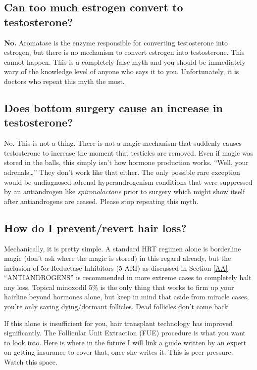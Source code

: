 \documentclass{article}
\begin{document}
{{\subsection{Can too much estrogen convert to testosterone?}

\textbf{No.} Aromatase is the enzyme responsible for converting testosterone into estrogen, but there is no mechanism to convert estrogen into testosterone. This cannot happen. This is a completely false myth and you should be immediately wary of the knowledge level of anyone who says it to you. Unfortunately, it is doctors who repeat this myth the most.

\subsection{Does bottom surgery cause an increase in testosterone?}

No. This is not a thing. There is not a magic mechanism that suddenly causes testosterone to increase the moment that testicles are removed. Even if magic was stored in the balls, this simply isn’t how hormone production works. “Well, your adrenals…” They don’t work like that either. The only possible rare exception would be undiagnosed adrenal hyperandrogenism conditions that were suppressed by an antiandrogen like \textit{spironolactone }prior to surgery which might show itself after antiandrogens are ceased. Please stop repeating this myth.

\subsection{How do I prevent/revert hair loss?}\label{11-14}

Mechanically, it is pretty simple. A standard HRT regimen alone is borderline magic (don’t ask where the magic is stored) in this regard already, but the inclusion of 5$\alpha$-Reductase Inhibitors (5-ARI) as discussed in Section \ref{AA} “ANTIANDROGENS” is recommended in more extreme cases to completely halt any loss. Topical minoxodil 5\% is the only thing that works to firm up your hairline beyond hormones alone, but keep in mind that aside from miracle cases, you’re only saving dying/dormant follicles. Dead follicles don’t come back.

If this alone is insufficient for you, hair transplant technology has improved significantly. The Follicular Unit Extraction (FUE) procedure is what you want to look into. Here is where in the future I will link a guide written by an expert on getting insurance to cover that, once she writes it. This is peer pressure. Watch this space.

}}
\end{document}
